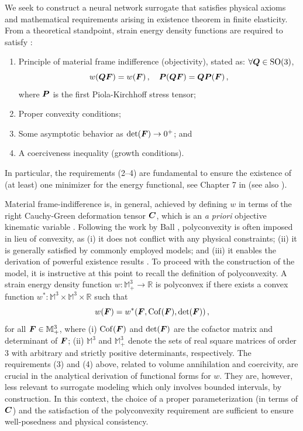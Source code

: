 We seek to construct a neural network surrogate that satisfies physical axioms and mathematical requirements arising in existence theorem in finite elasticity. From a theoretical standpoint, strain energy density functions are required to satisfy \cite{ciarlet1988mathematical,truesdell2004non}:
\begin{enumerate}
    \item Principle of material frame indifference (objectivity), stated as: $\forall \boldsymbol{Q} \in \mathrm{SO}(3)$,
    \begin{equation}
            w(\boldsymbol{Q} \boldsymbol{F}) = w(\boldsymbol{F})\,, \quad \boldsymbol{P}(\boldsymbol{Q} \boldsymbol{F}) = \boldsymbol{Q} \boldsymbol{P}(\boldsymbol{F})\,,
    \end{equation}
    where $\boldsymbol{P}$ is the first Piola-Kirchhoff stress tensor;
    \item Proper convexity conditions; 
    \item Some asymptotic behavior as $\det (\boldsymbol{F}) \to 0^+$; and
    \item A coerciveness inequality (growth conditions).
\end{enumerate}
In particular, the requirements (2--4) are fundamental to ensure the existence of (at least) one minimizer for the energy functional, see Chapter 7 in \cite{ciarlet1988mathematical} (see also \cite{pedregal2000variational,Dacorogna1989}).

Material frame-indifference is, in general, achieved by defining $w$ in terms of the right Cauchy-Green deformation tensor $\boldsymbol{C}$, which is an \textit{a priori} objective kinematic variable \cite{truesdell2004non}. Following the work by Ball \cite{ball1976convexity}, polyconvexity is often imposed in lieu of convexity, as (i) it does not conflict with any physical constraints; (ii) it is generally satisfied by commonly employed models; and (iii) it enables the derivation of powerful existence results \cite{ciarlet1988mathematical}. To proceed with the construction of the model, it is instructive at this point to recall the definition of polyconvexity. A strain energy density function $w:\mathbb{M}_+^3 \to \mathbb{R}$ is polyconvex if there exists a convex function $w^*:\mathbb{M}^3 \times \mathbb{M}^3 \times \mathbb{R}$ such that
\begin{equation}  
    w(\boldsymbol{F}) = w^*(\boldsymbol{F}, \mathrm{Cof}(\boldsymbol{F}), \det(\boldsymbol{F}))\,, 
\end{equation}
for all $\boldsymbol{F} \in \mathbb{M}_+^3$, where (i) $\mathrm{Cof}(\boldsymbol{F})$ and $\det(\boldsymbol{F})$ are the cofactor matrix and determinant of $\boldsymbol{F}$; (ii) $\mathbb{M}^3$ and $\mathbb{M}_+^3$ denote the sets of real square matrices of order $3$ with arbitrary and strictly positive determinants, respectively. The requirements (3) and (4) above, related to volume annihilation and coercivity, are crucial in the analytical derivation of functional forms for $w$. They are, however, less relevant to surrogate modeling which only involves bounded intervals, by construction. In this context, the choice of a proper parameterization (in terms of $\boldsymbol{C}$) and the satisfaction of the polyconvexity requirement are sufficient to ensure well-posedness and physical consistency. 

